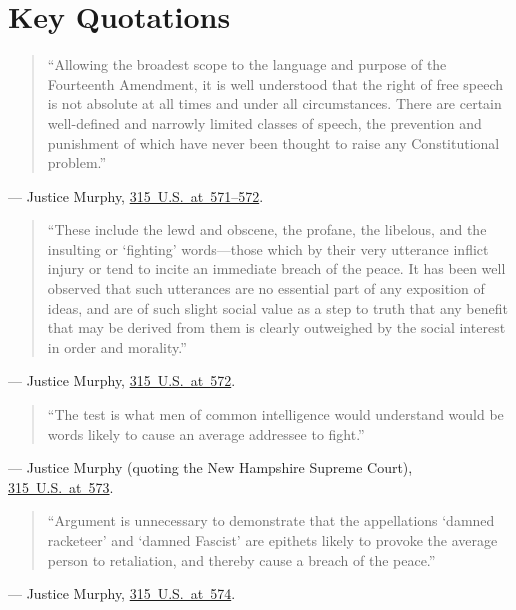 \documentclass[12pt]{article}
\begin{document}
\section{Key Quotations}
\begin{quote}
``Allowing the broadest scope to the language and purpose of the Fourteenth Amendment, it is well understood that the right of free speech is not absolute at all times and under all circumstances. There are certain well-defined and narrowly limited classes of speech, the prevention and punishment of which have never been thought to raise any Constitutional problem.''
\end{quote}
\noindent --- Justice Murphy, \href{https://supreme.justia.com/cases/federal/us/315/568/}{315~U.S.~at~571--572}.

\begin{quote}
``These include the lewd and obscene, the profane, the libelous, and the insulting or `fighting' words---those which by their very utterance inflict injury or tend to incite an immediate breach of the peace. It has been well observed that such utterances are no essential part of any exposition of ideas, and are of such slight social value as a step to truth that any benefit that may be derived from them is clearly outweighed by the social interest in order and morality.''
\end{quote}
\noindent --- Justice Murphy, \href{https://supreme.justia.com/cases/federal/us/315/568/}{315~U.S.~at~572}.

\begin{quote}
``The test is what men of common intelligence would understand would be words likely to cause an average addressee to fight.''
\end{quote}
\noindent --- Justice Murphy (quoting the New Hampshire Supreme Court), \href{https://supreme.justia.com/cases/federal/us/315/568/}{315~U.S.~at~573}.

\begin{quote}
``Argument is unnecessary to demonstrate that the appellations `damned racketeer' and `damned Fascist' are epithets likely to provoke the average person to retaliation, and thereby cause a breach of the peace.''
\end{quote}
\noindent --- Justice Murphy, \href{https://supreme.justia.com/cases/federal/us/315/568/}{315~U.S.~at~574}.
\end{document}
